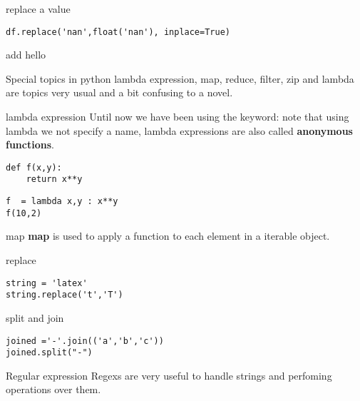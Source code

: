 \documentclass{beamer}
\begin{document}
\begin{frame}[fragile]{replace a value}
\begin{lstlisting}
df.replace('nan',float('nan'), inplace=True)
\end{lstlisting}
\end{frame}



\begin{frame}[fragile]{add}
hello 
\end{frame}





\begin{frame}[fragile]{Special topics in python}
lambda expression, map, reduce, filter, zip and lambda are topics very usual and a bit confusing to a novel.

\end{frame}


\begin{frame}[fragile]{lambda expression}
Until now we have been using the keyword:
note that using lambda we not specify a name, lambda expressions are also called \textbf{anonymous functions}.
\begin{lstlisting}
def f(x,y):
	return x**y
\end{lstlisting}
\begin{lstlisting}
f  = lambda x,y : x**y
f(10,2)
\end{lstlisting}
\end{frame}

\begin{frame}[fragile]{map}
\textbf{map} is used to apply a function to each element in a iterable object.
\end{frame}


\begin{frame}[fragile]{replace}
\begin{lstlisting}
string = 'latex'
string.replace('t','T')
\end{lstlisting}
\end{frame}


\begin{frame}[fragile]{split and join}
\begin{lstlisting}
joined ='-'.join(('a','b','c'))
joined.split("-")
\end{lstlisting}
\end{frame}



\begin{frame}[fragile]{Regular expression}
Regexs are very useful to handle strings and perfoming operations over them.
\end{frame}
\end{document}
